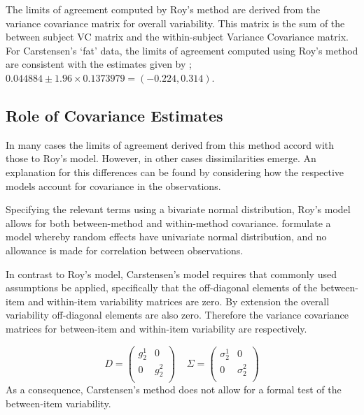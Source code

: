 \documentclass[12pt, a4paper]{report}
\theoremstyle{plain}
\theoremstyle{definition}
\theoremstyle{remark}
\begin{document}
	The limits of agreement computed by Roy's method are derived from the variance covariance matrix for overall variability.
	This matrix is the sum of the between subject VC matrix and the within-subject Variance Covariance matrix.
	For Carstensen's `fat' data, the limits of agreement computed using Roy's
	method are consistent with the estimates given by \citet{BXC2008}; $0.044884  \pm 1.96 \times  0.1373979 = (-0.224,  0.314).$
	
	
	
	
\subsection{Role of Covariance Estimates}
In many cases the limits of agreement derived from this method accord with those to Roy's model. However, in other cases dissimilarities emerge. An explanation for this differences can be found by considering how the respective models account for covariance in the observations. 
	
	Specifying the relevant terms using a bivariate normal distribution, Roy's model allows for both between-method and within-method covariance. \citet{BXC2008} formulate a model whereby random effects have univariate normal distribution, and no allowance is made for correlation between observations.
	
	In contrast to Roy's model, Carstensen's model requires that commonly used assumptions be applied, specifically that the off-diagonal elements of the between-item and within-item variability matrices are zero. By
	extension the overall variability off-diagonal elements are also zero. Therefore the variance covariance matrices for
	between-item and within-item variability are respectively.
	
	\[{D} = \left(
	\begin{array}{cc}
	g^1_2  & 0 \\
	0 & g^2_2 \\
	\end{array}
	\right) \;\;\;\; {\Sigma} = \left(
	\begin{array}{cc}
	\sigma^1_2  & 0 \\
	0 & \sigma^2_2 \\
	\end{array}
	\right) \]
	As a consequence, Carstensen's method does not allow for a formal test of the between-item variability.
	
	
	
\end{document}
